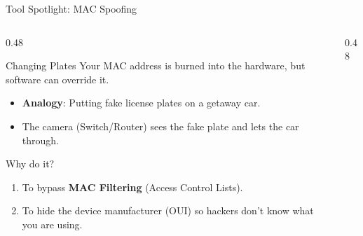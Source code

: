 \documentclass[aspectratio=169]{beamer}  %
\begin{document}
\begin{frame}{Tool Spotlight: MAC Spoofing}
    \begin{columns}[T]
        \begin{column}{0.48\textwidth}
            \begin{block}{Changing Plates}
                \footnotesize
                Your MAC address is burned into the hardware, but software can override it.
                \begin{itemize}
                    \item \textbf{Analogy}: Putting fake license plates on a getaway car.
                    \item The camera (Switch/Router) sees the fake plate and lets the car through.
                \end{itemize}
            \end{block}
            \begin{block}{Why do it?}
                \footnotesize
                \begin{enumerate}
                    \item To bypass \textbf{MAC Filtering} (Access Control Lists).
                    \item To hide the device manufacturer (OUI) so hackers don't know what you are using.
                \end{enumerate}
            \end{block}
        \end{column}
        \begin{column}{0.48\textwidth}
            \begin{center}
            \end{center}
        \end{column}
    \end{columns}
\end{frame}
\end{document}

